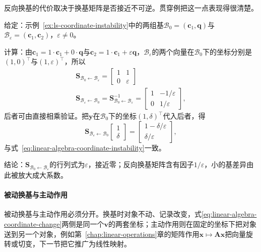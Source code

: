 反向换基的代价取决于换基矩阵是否接近不可逆。贯穿例把这一点表现得很清楚。
\begin{example}[近共线基之间的换基]
\label{ex:ls-nearly-collinear-change-of-basis}
给定：示例~\ref{ex:ls-coordinate-instability}中的两组基$\mathcal B_0=(\bm c_1,\bm q)$与$\mathcal B_\varepsilon=(\bm c_1,\bm c_2)$，$\varepsilon\neq0$。

计算：由$\bm c_1=1\cdot\bm c_1+0\cdot\bm q$与$\bm c_2=1\cdot\bm c_1+\varepsilon\bm q$，$\mathcal B_\varepsilon$的两个向量在$\mathcal B_0$下的坐标分别是$(1,0)^{\top}$与$(1,\varepsilon)^{\top}$，所以
\[
\begin{gathered}
\bm S_{\mathcal B_0\leftarrow\mathcal B_\varepsilon}
 =\begin{bmatrix}1&1\\0&\varepsilon\end{bmatrix}\\
\bm S_{\mathcal B_\varepsilon\leftarrow\mathcal B_0}
 =\bm S_{\mathcal B_0\leftarrow\mathcal B_\varepsilon}^{-1}
 =\begin{bmatrix}1&-1/\varepsilon\\0&1/\varepsilon\end{bmatrix},
\end{gathered}
\]
后者可由直接相乘验证。把$\bm y$在$\mathcal B_0$下的坐标$(1,\delta)^{\top}$代入后者，得
\[
 \bm S_{\mathcal B_\varepsilon\leftarrow\mathcal B_0}\begin{bmatrix}1\\\delta\end{bmatrix}
 =\begin{bmatrix}1-\delta/\varepsilon\\\delta/\varepsilon\end{bmatrix},
\]
与式~\eqref{eq:linear-algebra-coordinate-instability}一致。

结论：$\bm S_{\mathcal B_0\leftarrow\mathcal B_\varepsilon}$的行列式为$\varepsilon$，接近零；反向换基矩阵含有因子$1/\varepsilon$，小的基差异由此被放大成大系数。
\end{example}

\paragraph{被动换基与主动作用}
被动换基与主动作用必须分开。换基时对象不动、记录改变，式\eqref{eq:linear-algebra-coordinate-change}两侧是同一个$\bm v$的两套坐标；主动作用则在固定的坐标下把对象送到另一个对象，例如第~\ref{chap:linear-operations}章的矩阵作用$\bm x\mapsto\bm A\bm x$把向量旋转或切变，下一节把它推广为线性映射。

